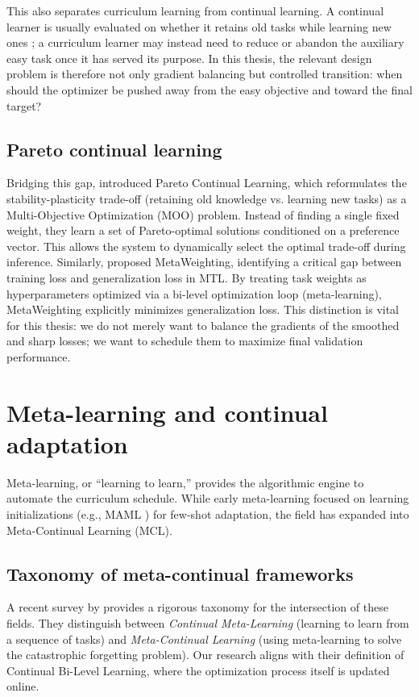 \documentclass[english,master,a4paper,oneside]{ppfcmthesis}
\begin{document}
This also separates curriculum learning from continual learning. A continual
learner is usually evaluated on whether it retains old tasks while learning new
ones \citep{parisi2019continual}; a curriculum learner may instead need to reduce
or abandon the auxiliary easy task once it has served its purpose. In this
thesis, the relevant design problem is therefore not only gradient balancing but
controlled transition: when should the optimizer be pushed away from the easy
objective and toward the final target?

\subsection{Pareto continual learning}
Bridging this gap, \citet{lai2025pareto} introduced Pareto Continual
	Learning, which reformulates the stability-plasticity trade-off (retaining old
knowledge vs. learning new tasks) as a Multi-Objective Optimization (MOO)
problem. Instead of finding a single fixed weight, they learn a set of
Pareto-optimal solutions conditioned on a preference vector. This allows the
system to dynamically select the optimal trade-off during inference. Similarly,
\citet{mao2022metaweighting} proposed MetaWeighting, identifying a
critical gap between training loss and generalization loss in MTL. By treating
task weights as hyperparameters optimized via a bi-level optimization loop
(meta-learning), MetaWeighting explicitly minimizes generalization loss. This
distinction is vital for this thesis: we do not merely want to balance the
gradients of the smoothed and sharp losses; we want to schedule them to
maximize final validation performance.

\section{Meta-learning and continual adaptation}
\label{sec:meta-learning-continual}

Meta-learning, or ``learning to learn,'' provides the algorithmic engine to
automate the curriculum schedule. While early meta-learning focused on learning
initializations (e.g., MAML \citep{finn2017model}) for few-shot adaptation, the
field has expanded into Meta-Continual Learning (MCL).

\subsection{Taxonomy of meta-continual frameworks}
A recent survey by \citet{son2024meta} provides a rigorous taxonomy for the
intersection of these fields. They distinguish between \textit{Continual
	Meta-Learning} (learning to learn from a sequence of tasks) and
\textit{Meta-Continual Learning} (using meta-learning to solve the catastrophic
forgetting problem). Our research aligns with their definition of
Continual Bi-Level Learning, where the optimization process itself is
updated online.
\end{document}

